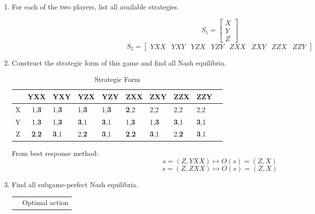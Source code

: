 \documentclass[11pt]{article}
\begin{document}
\begin{enumerate}
\begin{solution}
\[\begin{tikzpicture}[scale=1.2, every node/.style={draw, circle, inner sep=1pt}]
        \draw (D) -- (I)[->] node[midway, left] {X};
        \draw (D) -- (J) node[midway, right] {Y};
    \end{tikzpicture}\]
    \end{solution}
    \item[(b)] For each of the two players, list all available strategies.
    \begin{solution}
        \[\boxed{S_1 = \begin{bmatrix}
            X\\Y\\Z
        \end{bmatrix}}\]
        \[\boxed{S_2 = \begin{bmatrix}
            YXX & YXY & YZX & YZY & ZXX & ZXY & ZZX & ZZY
        \end{bmatrix}}\]
    \end{solution}
    \item[(c)] Construct the strategic form of this game and find all Nash equilibria.
    \begin{solution}
        \begin{table}[H]
        \centering
        \begin{tabular}{|c|c|l|l|l|l|l|l|l|l} \hline 
  & YXX & YXY & YZX & YZY & ZXX & ZXY & ZZX &ZZY \\\hline 
X & 1,\textbf{3} & 1,\textbf{3} & 1,\textbf{3} & 1,\textbf{3} & \textbf{2},2 & 2,2 & 2,2 & 2,2 
    \\\hline 
Y & 1,\textbf{3} & 1,\textbf{3} & \textbf{3},1 & \textbf{3},1 & 1,\textbf{3} & 1,\textbf{3} & \textbf{3},1 &  \textbf{3},1
    \\\hline 
Z & \textbf{2},\textbf{2} & \textbf{3},1 & 2,\textbf{2} &\textbf{3},1 &\textbf{2},\textbf{2} &\textbf{3},1 & 2,\textbf{2} & \textbf{3},1
    \\\hline 
\end{tabular}
        \caption{Strategic Form}
    \end{table}
From best response method:
\[\boxed{s = (Z, YXX) \mapsto O(s) = (Z,X)}\]
\[\boxed{s = (Z, ZXX) \mapsto O(s) = (Z,X)}\]
    \end{solution}
    \item[(d)] Find all subgame-perfect Nash equilibria.
\begin{solution}
    \begin{table}[H]
        \centering
        \begin{tabular}{cl}
                                &Optimal action    \\

\end{tabular}
\end{table}
\end{solution}
\end{enumerate}
\end{document}
